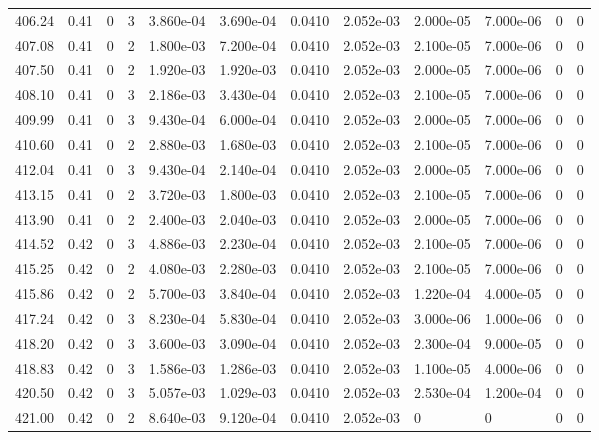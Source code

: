 \documentclass[preview]{standalone}
\begin{document}
{{{{{{{{{{{{{{\begin{tabular}{L{1.2cm}C{1.2cm} C{0.3cm}C{0.5cm} C{1.4cm}C{1.4cm} C{1.4cm}C{1.4cm} C{1.6cm}C{1.6cm} C{1.6cm}C{1.6cm}}
  406.24  &  0.41  & 0     &  3 &  3.860e-04  & 3.690e-04  &  0.0410&   2.052e-03& 2.000e-05 & 7.000e-06   &  0 & 0  \\ 
  407.08  &  0.41  & 0     &  2 &  1.800e-03  & 7.200e-04  &  0.0410&   2.052e-03& 2.100e-05 & 7.000e-06   &  0 & 0  \\ 
  407.50  &  0.41  & 0     &  2 &  1.920e-03  & 1.920e-03  &  0.0410&   2.052e-03& 2.000e-05 & 7.000e-06   &  0 & 0  \\ 
  408.10  &  0.41  & 0     &  3 &  2.186e-03  & 3.430e-04  &  0.0410&   2.052e-03& 2.100e-05 & 7.000e-06   &  0 & 0  \\ 
  409.99  &  0.41  & 0     &  3 &  9.430e-04  & 6.000e-04  &  0.0410&   2.052e-03& 2.000e-05 & 7.000e-06   &  0 & 0  \\ 
  410.60  &  0.41  & 0     &  2 &  2.880e-03  & 1.680e-03  &  0.0410&   2.052e-03& 2.100e-05 & 7.000e-06   &  0 & 0  \\ 
  412.04  &  0.41  & 0     &  3 &  9.430e-04  & 2.140e-04  &  0.0410&   2.052e-03& 2.000e-05 & 7.000e-06   &  0 & 0  \\ 
  413.15  &  0.41  & 0     &  2 &  3.720e-03  & 1.800e-03  &  0.0410&   2.052e-03& 2.100e-05 & 7.000e-06   &  0 & 0  \\ 
  413.90  &  0.41  & 0     &  2 &  2.400e-03  & 2.040e-03  &  0.0410&   2.052e-03& 2.000e-05 & 7.000e-06   &  0 & 0  \\ 
  414.52  &  0.42  & 0     &  3 &  4.886e-03  & 2.230e-04  &  0.0410&   2.052e-03& 2.100e-05 & 7.000e-06   &  0 & 0  \\ 
  415.25  &  0.42  & 0     &  2 &  4.080e-03  & 2.280e-03  &  0.0410&   2.052e-03& 2.100e-05 & 7.000e-06   &  0 & 0  \\ 
  415.86  &  0.42  & 0     &  2 &  5.700e-03  & 3.840e-04  &  0.0410&   2.052e-03& 1.220e-04 & 4.000e-05   &  0 & 0  \\ 
  417.24  &  0.42  & 0     &  3 &  8.230e-04  & 5.830e-04  &  0.0410&   2.052e-03& 3.000e-06 & 1.000e-06   &  0 & 0  \\ 
  418.20  &  0.42  & 0     &  3 &  3.600e-03  & 3.090e-04  &  0.0410&   2.052e-03& 2.300e-04 & 9.000e-05   &  0 & 0  \\ 
  418.83  &  0.42  & 0     &  3 &  1.586e-03  & 1.286e-03  &  0.0410&   2.052e-03& 1.100e-05 & 4.000e-06   &  0 & 0  \\ 
  420.50  &  0.42  & 0     &  3 &  5.057e-03  & 1.029e-03  &  0.0410&   2.052e-03& 2.530e-04 & 1.200e-04   &  0 & 0  \\ 
  421.00  &  0.42  & 0     &  2 &  8.640e-03  & 9.120e-04  &  0.0410&   2.052e-03& 0 & 0   &  0 & 0  \\ 

\end{tabular}}}}}}}}}}}}}}}
\end{document}
